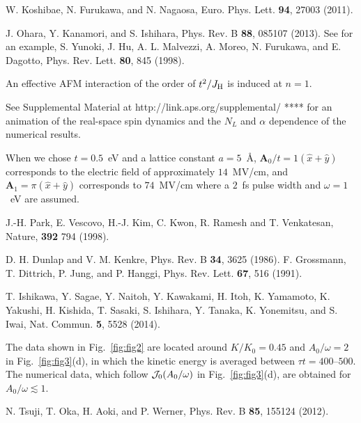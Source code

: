\documentclass[aps,twocolumn,showpacs,prl,amsmath,amssymb]{revtex4-1}
\begin{document}
\begin{thebibliography}{99}
W. Koshibae, N. Furukawa, and N. Nagaosa, Euro. Phys. Lett. {\bf 94}, 27003 (2011). 

J. Ohara, Y. Kanamori, and S. Ishihara, 
Phys. Rev. B {\bf 88}, 085107 (2013). 
See for an example, S. Yunoki, J. Hu, A. L. Malvezzi, A. Moreo, N. Furukawa, and E. Dagotto, 
Phys. Rev. Lett. {\bf 80}, 845 (1998). 

An effective AFM interaction of the order of $t^2/J_{\rm H}$ is induced at $n=1$. 

See Supplemental Material at http://link.aps.org/supplemental/
**** for an animation of the real-space spin dynamics and the $N_L$ and $\alpha$ dependence of the numerical results. 

When we chose $t=0.5$~eV and a lattice constant $a=5$~\AA, $\bm{A}_0/t=1(\hat{x}+\hat{y})$ corresponds to the electric field of approximately $14$~MV/cm, and $\bm{A}_1 = \pi (\hat{x}+\hat{y})$ corresponds to $74$~MV/cm where a $2$~fs pulse width and $\omega=1$~eV are assumed. 

J.-H. Park, E. Vescovo, H.-J. Kim, C. Kwon, R. Ramesh and T. Venkatesan, 
Nature, {\bf 392} 794 (1998). 

%
D. H. Dunlap and V. M. Kenkre, Phys. Rev. B {\bf 34}, 3625 (1986).
%
F. Grossmann, T. Dittrich, P. Jung, and P. Hanggi,
Phys. Rev. Lett. {\bf 67}, 516 (1991).

T. Ishikawa, Y. Sagae, Y. Naitoh, Y. Kawakami, H. Itoh, K. Yamamoto, K. Yakushi, H. Kishida, T. Sasaki, S. Ishihara, Y. Tanaka, K. Yonemitsu, and S. Iwai, 
Nat. Commun. {\bf 5}, 5528 (2014). 

The data shown in Fig.~\ref{fig:fig2} are located around $K/K_0=0.45$ and $A_0/\omega=2$
in Fig.~\ref{fig:fig3}(d), in which the kinetic energy is averaged between $\tau t=400$--$500$. 
The numerical data, which follow ${\cal J}_0(A_0/\omega)$ in Fig.~\ref{fig:fig3}(d), 
are obtained for $A_0/\omega \lesssim 1$. 

N. Tsuji, T. Oka, H. Aoki, and P. Werner, 
Phys. Rev. B {\bf 85}, 155124 (2012). 


\end{thebibliography}
\end{document}
